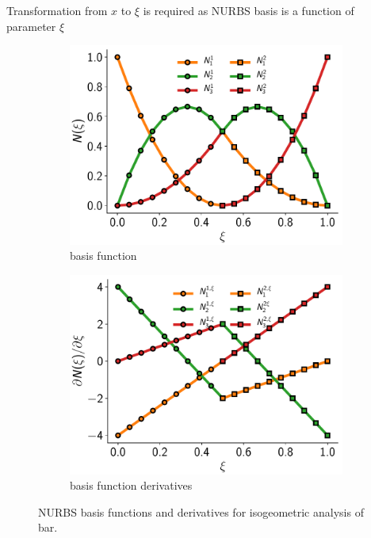 \documentclass[submit,12pt]{aiaa-pretty} %
\begin{document}
Transformation from $x$ to $\xi$ is required as NURBS basis is a
function of parameter $\xi$
\begin{figure}[h] 
  \begin{subfigure}{0.48\textwidth}
    \centering
    \includegraphics[width=1.0\textwidth]{figures/bar-basis-functions.pdf}
    \caption{basis function}
  \end{subfigure}
  \begin{subfigure}{0.48\textwidth}
    \centering
    \includegraphics[width=1.0\textwidth]{figures/bar-basis-function-derivatives.pdf}
    \caption{basis function derivatives}
  \end{subfigure}
  \caption{NURBS basis functions and derivatives for isogeometric
    analysis of bar.}
  \label{fig:nurbs-basis-function-derivatives}
\end{figure}
\end{document}

